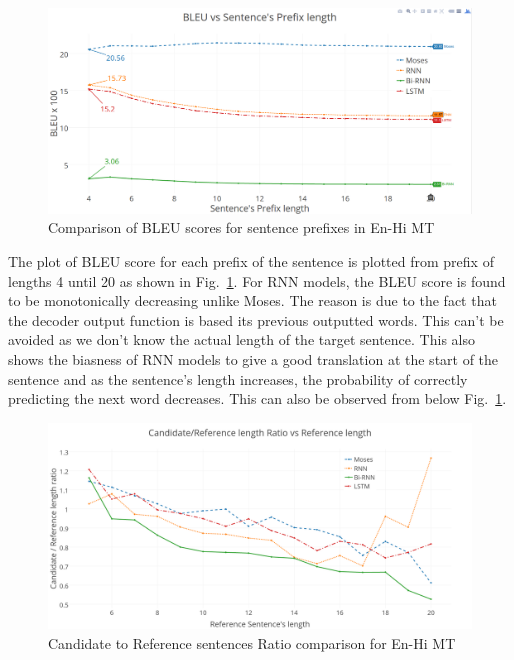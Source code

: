 \documentclass[12pt]{report}
\begin{document}
\begin{figure}
\centering
\includegraphics[width=6.5in]{3.png}
\caption{Comparison of BLEU scores for sentence prefixes in En-Hi MT}
\vspace{-0.4cm}
\label{prefix}
\end{figure}

The plot of BLEU score for each prefix of the sentence is plotted from prefix of lengths 4 until 20 as shown in Fig.~\ref{prefix}. For RNN models, the BLEU score is found to be monotonically decreasing unlike Moses. The reason is due to the fact that the decoder output function is based its previous outputted words. This can't be avoided as we don't know the actual length of the target sentence. 
This also shows the biasness of RNN models to give a good translation at the start of the sentence and as the sentence's length increases, the probability of correctly predicting the next word decreases. This can also be observed from below Fig.~\ref{prefix}.

\begin{figure}
\centering
\includegraphics[width=6.5in]{4.png}
\caption{Candidate to Reference sentences Ratio comparison for En-Hi MT}
\vspace{-0.4cm}
\label{ratio}
\end{figure}
\end{document}

